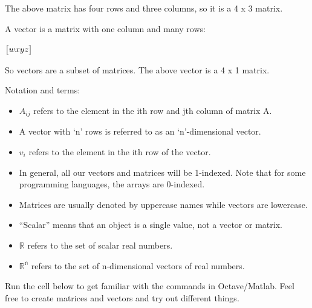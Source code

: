 \documentclass[
]{book}
\providecommand{\tightlist}{%
  \setlength{\itemsep}{0pt}\setlength{\parskip}{0pt}}
\begin{document}
The above matrix has four rows and three columns, so it is a 4 x 3 matrix.

A vector is a matrix with one column and many rows:

\(\begin{bmatrix} w \newline x \newline y \newline z \end{bmatrix}\)

So vectors are a subset of matrices. The above vector is a 4 x 1 matrix.

Notation and terms:

\begin{itemize}
\tightlist
\item
  \(A_{ij}\) refers to the element in the ith row and jth column of matrix A.
\item
  A vector with `n' rows is referred to as an `n'-dimensional vector.
\item
  \(v_i\) refers to the element in the ith row of the vector.
\item
  In general, all our vectors and matrices will be 1-indexed. Note that for some programming languages, the arrays are 0-indexed.
\item
  Matrices are usually denoted by uppercase names while vectors are lowercase.
\item
  ``Scalar'' means that an object is a single value, not a vector or matrix.
\item
  \(\mathbb{R}\) refers to the set of scalar real numbers.
\item
  \(\mathbb{R^n}\) refers to the set of n-dimensional vectors of real numbers.
\end{itemize}

Run the cell below to get familiar with the commands in Octave/Matlab. Feel free to create matrices and vectors and try out different things.
\end{document}
